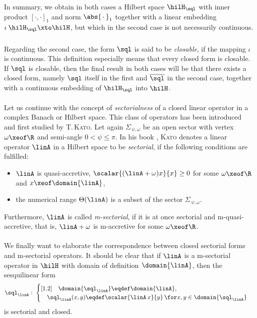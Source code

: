 \documentclass[11pt,twoside]{article}
\begin{document}
\paragraph{} %
In summary,
we obtain in both cases a Hilbert space $\hilH_{\sql}$ with inner product
$[\cdot,\cdot]_1$ and norm $\abs{\,\cdot\,} _1$ together with a linear embedding
$\iota\: \hilH_{\sql} \xto \hilH$,
but which in the second case is not necessarily continuous.

\subparagraph{} 
Regarding the second case,
the form $\sql$ is said to be \textit{closable},
if the mapping $\iota$ is continuous.
This definition especially means that every closed form is closable.
If $\sql$ is closable,
then the final result in both cases will be
that there exists a closed form,
namely $\sql$ itself in the first and $\overline{\sql}$ in the second case,
together with a continuous embedding of $\hilH_{\sql}$ into $\hilH$.

\paragraph{} %
Let us continue with the concept of \textit{sectorialness}
of a closed linear operator in a complex Banach or Hilbert space.
This class of operators has been introduced and first studied
by \textsc{T.\,Kato}.
Let again $\Sigma_{\,\psi,\omega}$
be an open sector with vertex $\omega \xeof \R$
and semi-angle $0 < \psi \leq \pi$.
In his book \cite{XI_Ka},
\textsc{Kato} denotes a linear operator $\linA$ in a Hilbert space
to be \textit{sectorial},
if the following conditions are fulfilled:

\begin{itemize}[labelsep=4mm,leftmargin=20pt]
\item[(S-1)]
$\linA$ is {quasi-accretive},
{\ie} $\scalar{(\linA + \omega) x}{x} \geq 0$
for some $\omega \xeof \R$ and $x \xeof \domain{\linA}$,

\item[(S-2)]
the numerical range $\Theta(\linA)$ is a subset of the sector
$\Sigma_{\,\psi,\omega}$.
\end{itemize}

Furthermore,
$\linA$ is called \textit{m-sectorial},
if it is at once sectorial and m-quasi-accretive,
that is,
$\linA + \omega$ is m-accretive for some $\omega \xeof \R$.

\paragraph{} %
We finally want to elaborate the correspondence
between closed sectorial forms and m-sectorial operators.
It should be clear
that if $\linA$ is a m-sectorial operator in $\hilH$
with domain of definition $\domain{\linA}$,
then the sesquilinear form
\[
\sql_{\linA}: \;
\begin{cases}[1.2]
\quad \domain{\sql_{\linA}} \eqdef \domain{\linA}, \\
\quad \sql_{\linA}(x,y) \eqdef \scalar{\linA \,x}{y}
\, \for x,y \in \domain{\sql_{\linA}} \\
\end{cases}
\]
is sectorial and closed.
\end{document}
